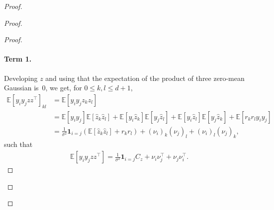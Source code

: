 \documentclass[11pt]{article}
\newcommand{\EE}{\mathbb{E}}
\begin{document}
\begin{proof}
\begin{proof}
\begin{proof}
\paragraph{Term 1.} Developing $z$ and using that the expectation of the product of three zero-mean Gaussian is~$0$, we get, for $0 \leq k,l \leq d+1$,
    \begin{align*}
    \EE[y_i y_j z z^\top]_{kl} &=\EE[y_i y_j z_k z_l]   \\
    &= \EE[y_i y_j]\EE[\hat z_k \hat z_l] + \EE[y_i \hat z_k]\EE[y_j \hat z_l] + \EE[y_i \hat z_l]\EE[y_j \hat z_k] + \EE[r_k r_l y_i y_j]   \\
    &= \frac{1}{\sigma^2}\mathbf{1}_{i=j} (\EE[\hat z_k \hat z_l] + r_k r_l) + (\nu_i)_k (\nu_j)_l +  (\nu_i)_l (\nu_j)_k ,
    \end{align*}
such that 
\begin{align*}
 \EE[y_i y_j z z^\top] = \frac{1}{\sigma^2} \mathbf{1}_{i=j} C_z  + \nu_i \nu_j^\top + \nu_j \nu_i^\top.
 \end{align*}

\end{proof}
\end{proof}
\end{proof}
\end{document}
